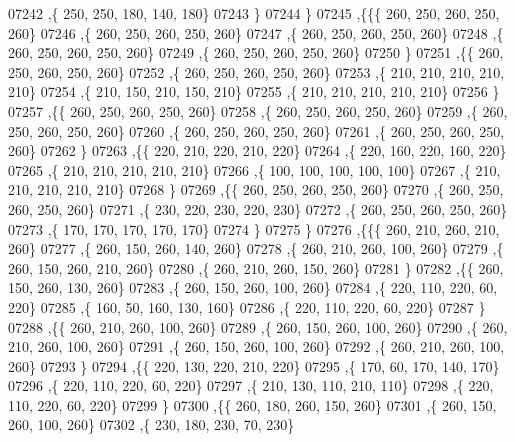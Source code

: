 \begin{DoxyCode}
07242     ,\{   250,   250,   180,   140,   180\}
07243     \}
07244    \}
07245   ,\{\{\{   260,   250,   260,   250,   260\}
07246     ,\{   260,   250,   260,   250,   260\}
07247     ,\{   260,   250,   260,   250,   260\}
07248     ,\{   260,   250,   260,   250,   260\}
07249     ,\{   260,   250,   260,   250,   260\}
07250     \}
07251    ,\{\{   260,   250,   260,   250,   260\}
07252     ,\{   260,   250,   260,   250,   260\}
07253     ,\{   210,   210,   210,   210,   210\}
07254     ,\{   210,   150,   210,   150,   210\}
07255     ,\{   210,   210,   210,   210,   210\}
07256     \}
07257    ,\{\{   260,   250,   260,   250,   260\}
07258     ,\{   260,   250,   260,   250,   260\}
07259     ,\{   260,   250,   260,   250,   260\}
07260     ,\{   260,   250,   260,   250,   260\}
07261     ,\{   260,   250,   260,   250,   260\}
07262     \}
07263    ,\{\{   220,   210,   220,   210,   220\}
07264     ,\{   220,   160,   220,   160,   220\}
07265     ,\{   210,   210,   210,   210,   210\}
07266     ,\{   100,   100,   100,   100,   100\}
07267     ,\{   210,   210,   210,   210,   210\}
07268     \}
07269    ,\{\{   260,   250,   260,   250,   260\}
07270     ,\{   260,   250,   260,   250,   260\}
07271     ,\{   230,   220,   230,   220,   230\}
07272     ,\{   260,   250,   260,   250,   260\}
07273     ,\{   170,   170,   170,   170,   170\}
07274     \}
07275    \}
07276   ,\{\{\{   260,   210,   260,   210,   260\}
07277     ,\{   260,   150,   260,   140,   260\}
07278     ,\{   260,   210,   260,   100,   260\}
07279     ,\{   260,   150,   260,   210,   260\}
07280     ,\{   260,   210,   260,   150,   260\}
07281     \}
07282    ,\{\{   260,   150,   260,   130,   260\}
07283     ,\{   260,   150,   260,   100,   260\}
07284     ,\{   220,   110,   220,    60,   220\}
07285     ,\{   160,    50,   160,   130,   160\}
07286     ,\{   220,   110,   220,    60,   220\}
07287     \}
07288    ,\{\{   260,   210,   260,   100,   260\}
07289     ,\{   260,   150,   260,   100,   260\}
07290     ,\{   260,   210,   260,   100,   260\}
07291     ,\{   260,   150,   260,   100,   260\}
07292     ,\{   260,   210,   260,   100,   260\}
07293     \}
07294    ,\{\{   220,   130,   220,   210,   220\}
07295     ,\{   170,    60,   170,   140,   170\}
07296     ,\{   220,   110,   220,    60,   220\}
07297     ,\{   210,   130,   110,   210,   110\}
07298     ,\{   220,   110,   220,    60,   220\}
07299     \}
07300    ,\{\{   260,   180,   260,   150,   260\}
07301     ,\{   260,   150,   260,   100,   260\}
07302     ,\{   230,   180,   230,    70,   230\}

\end{DoxyCode}
